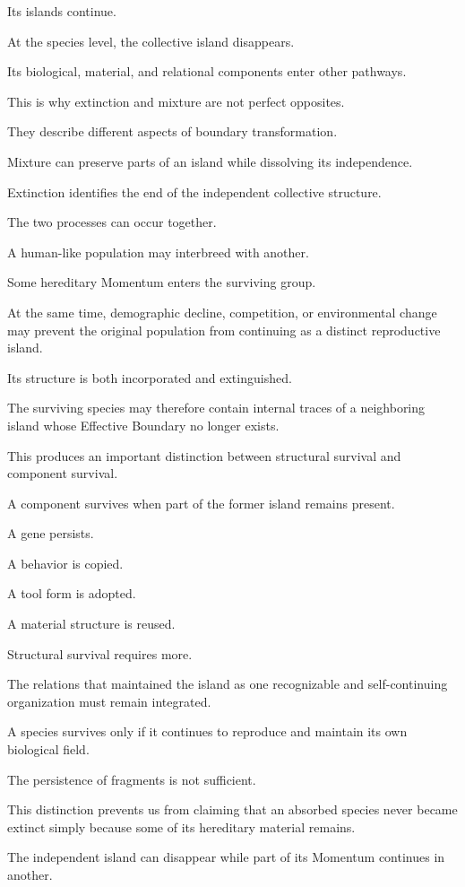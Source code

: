 Its islands continue.

At the species level, the collective island disappears.

Its biological, material, and relational components enter other pathways.

This is why extinction and mixture are not perfect opposites.

They describe different aspects of boundary transformation.

Mixture can preserve parts of an island while dissolving its independence.

Extinction identifies the end of the independent collective structure.

The two processes can occur together.

A human-like population may interbreed with another.

Some hereditary Momentum enters the surviving group.

At the same time, demographic decline, competition, or environmental change may prevent the original population from continuing as a distinct reproductive island.

Its structure is both incorporated and extinguished.

The surviving species may therefore contain internal traces of a neighboring island whose Effective Boundary no longer exists.

This produces an important distinction between structural survival and component survival.

A component survives when part of the former island remains present.

A gene persists.

A behavior is copied.

A tool form is adopted.

A material structure is reused.

Structural survival requires more.

The relations that maintained the island as one recognizable and self-continuing organization must remain integrated.

A species survives only if it continues to reproduce and maintain its own biological field.

The persistence of fragments is not sufficient.

This distinction prevents us from claiming that an absorbed species never became extinct simply because some of its hereditary material remains.

The independent island can disappear while part of its Momentum continues in another.

